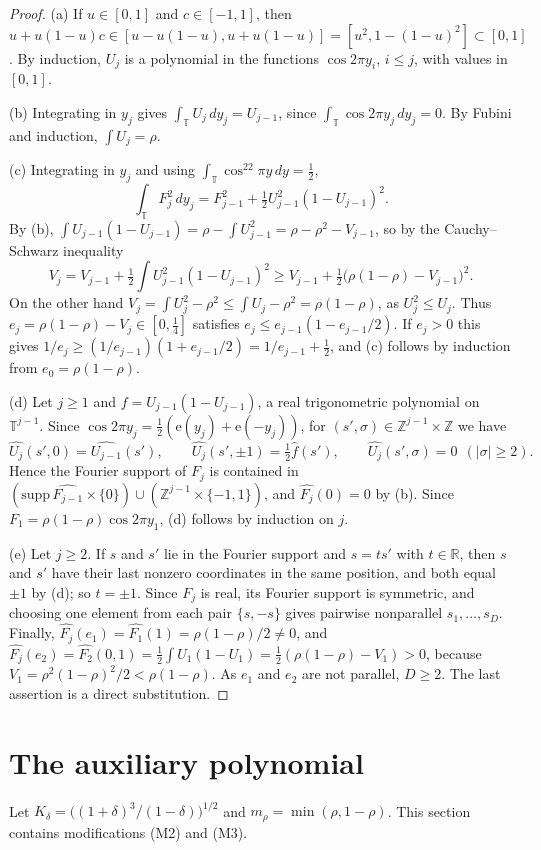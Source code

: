 \documentclass[11pt,reqno]{amsart}
\theoremstyle{definition}
\newcommand{\T}{\mathbb{T}}
\newcommand{\Z}{\mathbb{Z}}
\newcommand{\R}{\mathbb{R}}
\newcommand{\e}{\mathrm{e}}
\begin{document}
\begin{proof}
(a) If $u\in[0,1]$ and $c\in[-1,1]$, then $u+u(1-u)c\in[u-u(1-u),u+u(1-u)]=[u^2,1-(1-u)^2]\subset[0,1]$. By induction, $U_j$ is a polynomial in the functions $\cos2\pi y_i$, $i\le j$, with values in $[0,1]$.

(b) Integrating in $y_j$ gives $\int_\T U_j\,dy_j=U_{j-1}$, since $\int_\T\cos2\pi y_j\,dy_j=0$. By Fubini and induction, $\int U_j=\rho$.

(c) Integrating in $y_j$ and using $\int_\T\cos^22\pi y\,dy=\frac12$,
\[
\int_\T F_j^2\,dy_j=F_{j-1}^2+\tfrac12U_{j-1}^2(1-U_{j-1})^2 .
\]
By (b), $\int U_{j-1}(1-U_{j-1})=\rho-\int U_{j-1}^2=\rho-\rho^2-V_{j-1}$, so by the Cauchy--Schwarz inequality
\[
V_j=V_{j-1}+\tfrac12\int U_{j-1}^2(1-U_{j-1})^2\ge V_{j-1}+\tfrac12\big(\rho(1-\rho)-V_{j-1}\big)^2 .
\]
On the other hand $V_j=\int U_j^2-\rho^2\le\int U_j-\rho^2=\rho(1-\rho)$, as $U_j^2\le U_j$. Thus $e_j=\rho(1-\rho)-V_j\in[0,\frac14]$ satisfies $e_j\le e_{j-1}(1-e_{j-1}/2)$. If $e_j>0$ this gives $1/e_j\ge(1/e_{j-1})(1+e_{j-1}/2)=1/e_{j-1}+\frac12$, and (c) follows by induction from $e_0=\rho(1-\rho)$.

(d) Let $j\ge1$ and $f=U_{j-1}(1-U_{j-1})$, a real trigonometric polynomial on $\T^{j-1}$. Since $\cos2\pi y_j=\frac12(\e(y_j)+\e(-y_j))$, for $(s',\sigma)\in\Z^{j-1}\times\Z$ we have
\[
\widehat{U_j}(s',0)=\widehat{U_{j-1}}(s'),\qquad\widehat{U_j}(s',\pm1)=\tfrac12\widehat f(s'),\qquad\widehat{U_j}(s',\sigma)=0\ \ (|\sigma|\ge2).
\]
Hence the Fourier support of $F_j$ is contained in $(\mathrm{supp}\,\widehat{F_{j-1}}\times\{0\})\cup(\Z^{j-1}\times\{-1,1\})$, and $\widehat{F_j}(0)=0$ by (b). Since $F_1=\rho(1-\rho)\cos2\pi y_1$, (d) follows by induction on $j$.

(e) Let $j\ge2$. If $s$ and $s'$ lie in the Fourier support and $s=ts'$ with $t\in\R$, then $s$ and $s'$ have their last nonzero coordinates in the same position, and both equal $\pm1$ by (d); so $t=\pm1$. Since $F_j$ is real, its Fourier support is symmetric, and choosing one element from each pair $\{s,-s\}$ gives pairwise nonparallel $s_1,\dots,s_D$. Finally, $\widehat{F_j}(e_1)=\widehat{F_1}(1)=\rho(1-\rho)/2\ne0$, and $\widehat{F_j}(e_2)=\widehat{F_2}(0,1)=\frac12\int U_1(1-U_1)=\frac12(\rho(1-\rho)-V_1)>0$, because $V_1=\rho^2(1-\rho)^2/2<\rho(1-\rho)$. As $e_1$ and $e_2$ are not parallel, $D\ge2$. The last assertion is a direct substitution.
\end{proof}

\section{The auxiliary polynomial}\label{sec:aux}
Let $K_\delta=\big((1+\delta)^3/(1-\delta)\big)^{1/2}$ and $m_\rho=\min(\rho,1-\rho)$. This section contains modifications (M2) and (M3).
\end{document}
